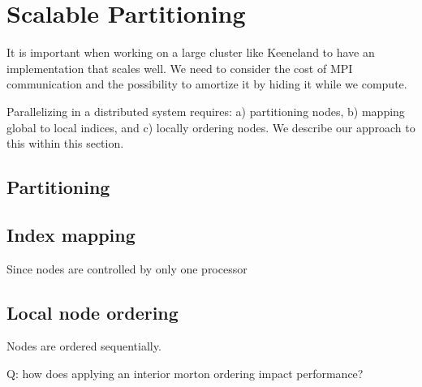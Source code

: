 \chapter{Scalable Partitioning} 
It is important when working on a large cluster like Keeneland to have an implementation that scales well. We need to consider the cost of MPI communication and the possibility to amortize it by hiding it while we compute.


Parallelizing in a distributed system requires: a) partitioning nodes, b) mapping global to local indices, and c) locally ordering nodes\cite{Saad2003}. We describe our approach to this within this section.

\section{Partitioning}

\section{Index mapping} 
Since nodes are controlled by only one processor

\section{Local node ordering}
Nodes are ordered sequentially. 

Q: how does applying an interior morton ordering impact performance? 
